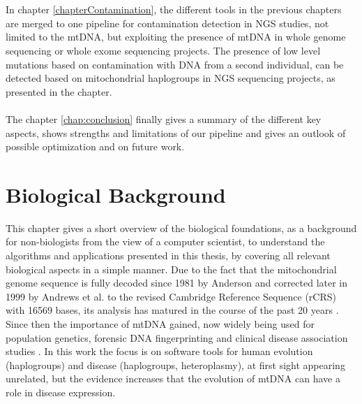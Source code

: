 \\
\\
In chapter \ref{chapterContamination}, the different tools in the previous chapters are merged to one pipeline for contamination detection in NGS studies, not limited to the mtDNA, but exploiting the presence of mtDNA in whole genome sequencing or whole exome sequencing projects. The presence of low level mutations based on contamination with DNA from a second individual, can be detected based on mitochondrial haplogroups in NGS sequencing projects, as presented in the chapter.
\\
\\
The chapter \ref{chap:conclusion} finally gives a summary of the different key aspects, shows strengths and limitations of our pipeline and gives an outlook of possible optimization and on future work.


\section{Biological Background} 
\label{chap:BioFound}
This chapter gives a short overview of the biological foundations, as a background for non-biologists from the view of a computer scientist, to understand the algorithms and applications presented in this thesis, by covering all relevant biological aspects in a simple manner. Due to the fact that the mitochondrial genome sequence is fully decoded since 1981 by Anderson \cite{Anderson1981} and corrected later in 1999 by Andrews et al. \cite{Andrews1999} to the revised Cambridge Reference Sequence (rCRS) with 16569 bases, its analysis has matured in the course of the past 20 years \cite{BandeltHansJurgenRichardsMartinMacaulay2006}. Since then the importance of mtDNA gained, now widely being used for population genetics, forensic DNA fingerprinting and clinical disease association studies \cite{Weissensteiner2010}. In this work the focus is on software tools for human evolution (haplogroups) and disease (haplogroups, heteroplasmy), at first sight appearing unrelated, but the evidence increases that the evolution of mtDNA can have a role in disease expression\cite{BandeltHansJurgenRichardsMartinMacaulay2006}. 


